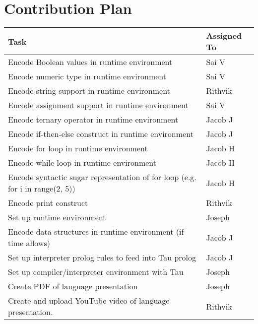 \documentclass{article}
\begin{document}
    
    \newpage
    \section{Contribution Plan}

    \begin{table}[h]
        \begin{tabular}{| l | l |}
            \hline
            Task & Assigned To \\
            \hline
            Encode Boolean values in runtime environment & Sai V \\
            Encode numeric type in runtime environment & Sai V \\
            Encode string support in runtime environment & Rithvik \\
            Encode assignment support in runtime environment & Sai V \\
            Encode ternary operator in runtime environment & Jacob J \\
            Encode if-then-else construct in runtime environment & Jacob J \\
            Encode for loop in runtime environment & Jacob H \\
            Encode while loop in runtime environment & Jacob H \\
            Encode syntactic sugar representation of for loop (e.g. for i in range(2, 5)) & Jacob H \\
            Encode print construct & Rithvik \\
            Set up runtime environment & Joseph \\
            Encode data structures in runtime environment (if time allows) & Jacob J \\
            Set up interpreter prolog rules to feed into Tau prolog & Jacob J \\
            Set up compiler/interpreter environment with Tau & Joseph \\
            Create PDF of language presentation & Joseph \\
            Create and upload YouTube video of language presentation. & Rithvik \\
            \hline
        \end{tabular}
    \end{table}

    \newpage
\end{document}
